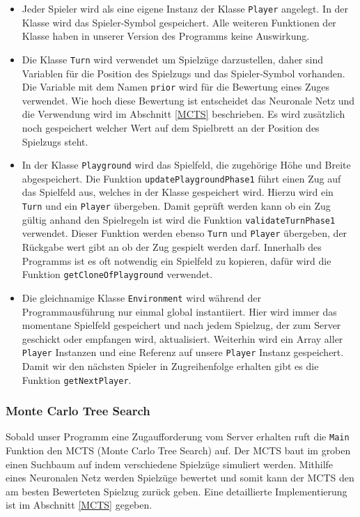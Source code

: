 \documentclass[12pt,a4paper]{article}
\begin{document}
\begin{itemize}

\item{Jeder Spieler wird als eine eigene Instanz der Klasse \texttt{Player} angelegt. In der Klasse wird das Spieler-Symbol gespeichert. Alle weiteren Funktionen der Klasse haben in unserer Version des Programms keine Auswirkung.}

\item{Die Klasse \texttt{Turn} wird verwendet um Spielzüge darzustellen, daher sind Variablen für die Position des Spielzugs und das Spieler-Symbol vorhanden. Die Variable mit dem Namen \texttt{prior} wird für die Bewertung eines Zuges verwendet. Wie hoch diese Bewertung ist entscheidet das Neuronale Netz und die Verwendung wird im Abschnitt \ref{MCTS} beschrieben. Es wird zusätzlich noch gespeichert welcher Wert auf dem Spielbrett an der Position des Spielzugs steht.}

\item{In der Klasse \texttt{Playground} wird das Spielfeld, die zugehörige Höhe und Breite abgespeichert. Die Funktion \texttt{updatePlaygroundPhase1} führt einen Zug auf das Spielfeld aus, welches in der Klasse gespeichert wird. Hierzu wird ein \texttt{Turn} und ein \texttt{Player} übergeben. Damit geprüft werden kann ob ein Zug gültig anhand den Spielregeln ist wird die Funktion \texttt{validateTurnPhase1} verwendet. Dieser Funktion werden ebenso \texttt{Turn} und \texttt{Player} übergeben, der Rückgabe wert gibt an ob der Zug gespielt werden darf. Innerhalb des Programms ist es oft notwendig ein Spielfeld zu kopieren, dafür wird die Funktion \texttt{getCloneOfPlayground} verwendet.}

\item{Die gleichnamige Klasse \texttt{Environment} wird während der Programmausführung nur einmal global instantiiert. Hier wird immer das momentane Spielfeld gespeichert und nach jedem Spielzug, der zum Server geschickt oder empfangen wird, aktualisiert. Weiterhin wird ein Array aller \texttt{Player} Instanzen und eine Referenz auf unsere \texttt{Player} Instanz gespeichert. Damit wir den nächsten Spieler in Zugreihenfolge erhalten gibt es die Funktion \texttt{getNextPlayer}.}

\end{itemize}

\subsubsection{Monte Carlo Tree Search}
Sobald unser Programm eine Zugaufforderung vom Server erhalten ruft die \texttt{Main} Funktion den MCTS (Monte Carlo Tree Search) auf. Der MCTS baut im groben einen Suchbaum auf indem verschiedene Spielzüge simuliert werden. Mithilfe eines Neuronalen Netz werden Spielzüge bewertet und somit kann der MCTS den am besten Bewerteten Spielzug zurück geben. Eine detaillierte Implementierung ist im Abschnitt \ref{MCTS} gegeben.
\end{document}

